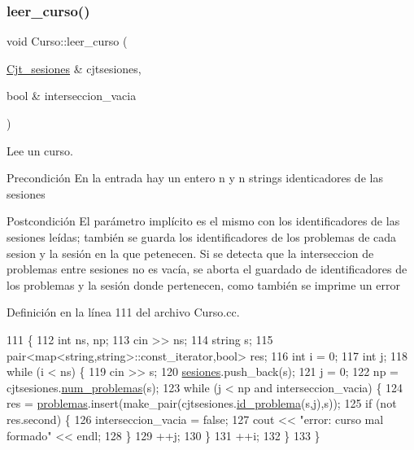\subsubsection{\texorpdfstring{leer\+\_\+curso()}{leer\_curso()}}
{\footnotesize\ttfamily void Curso\+::leer\+\_\+curso (\begin{DoxyParamCaption}\item[{\mbox{\hyperlink{class_cjt__sesiones}{Cjt\+\_\+sesiones}} \&}]{cjtsesiones,  }\item[{bool \&}]{interseccion\+\_\+vacia }\end{DoxyParamCaption})}



Lee un curso. 

\begin{DoxyPrecond}{Precondición}
En la entrada hay un entero n y n strings identicadores de las sesiones 
\end{DoxyPrecond}
\begin{DoxyPostcond}{Postcondición}
El parámetro implícito es el mismo con los identificadores de las sesiones leídas; también se guarda los identificadores de los problemas de cada sesion y la sesión en la que petenecen. Si se detecta que la interseccion de problemas entre sesiones no es vacía, se aborta el guardado de identificadores de los problemas y la sesión donde pertenecen, como también se imprime un error 
\end{DoxyPostcond}


Definición en la línea 111 del archivo Curso.\+cc.


\begin{DoxyCode}
111                                                                                 \{
112         \textcolor{keywordtype}{int} ns, np;
113         cin >> ns;
114         \textcolor{keywordtype}{string} s;
115         pair<map<string,string>::const\_iterator,\textcolor{keywordtype}{bool}> res;
116         \textcolor{keywordtype}{int} i = 0;
117         \textcolor{keywordtype}{int} j;
118         \textcolor{keywordflow}{while} (i < ns) \{
119           cin >> s;
120           \mbox{\hyperlink{class_curso_acd47bc8fe2f8121284246241d1e1dab5}{sesiones}}.push\_back(s);
121           j = 0;
122           np = cjtsesiones.\mbox{\hyperlink{class_cjt__sesiones_a25fab9688073ad869f8e8f53445955d6}{num\_problemas}}(s);
123           \textcolor{keywordflow}{while} (j < np and interseccion\_vacia) \{
124             res = \mbox{\hyperlink{class_curso_a56b39dae4abfc058cf57956af639f1cb}{problemas}}.insert(make\_pair(cjtsesiones.\mbox{\hyperlink{class_cjt__sesiones_a5dbd8b1687f2713d2b29af8781f1d013}{id\_problema}}(s,j),s));
125             \textcolor{keywordflow}{if} (not res.second) \{
126               interseccion\_vacia = \textcolor{keyword}{false};
127               cout << \textcolor{stringliteral}{"error: curso mal formado"} << endl;
128             \}
129             ++j;
130           \}
131           ++i;
132         \}
133       \}
\end{DoxyCode}
\mbox{\label{class_curso_a2c23a6c3350979d86b555cbd8ab9665d}} 
